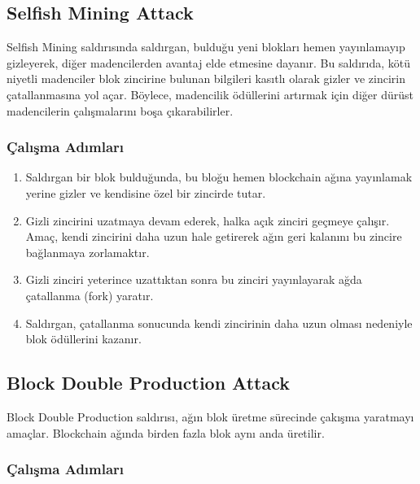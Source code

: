 \newpage

\subsection{Selfish Mining Attack}

Selfish Mining saldırısında saldırgan, bulduğu yeni blokları hemen yayınlamayıp gizleyerek, diğer madencilerden avantaj elde etmesine dayanır. Bu saldırıda, kötü niyetli madenciler blok zincirine bulunan bilgileri kasıtlı olarak gizler ve zincirin çatallanmasına yol açar. Böylece, madencilik ödüllerini artırmak için diğer dürüst madencilerin çalışmalarını boşa çıkarabilirler.

\subsubsection{Çalışma Adımları}

\begin{enumerate}
    \item Saldırgan bir blok bulduğunda, bu bloğu hemen blockchain ağına yayınlamak yerine gizler ve kendisine özel bir zincirde tutar.
    \item Gizli zincirini uzatmaya devam ederek, halka açık zinciri geçmeye çalışır. Amaç, kendi zincirini daha uzun hale getirerek ağın geri kalanını bu zincire bağlanmaya zorlamaktır.
    \item Gizli zinciri yeterince uzattıktan sonra bu zinciri yayınlayarak ağda çatallanma (fork) yaratır.
    \item Saldırgan, çatallanma sonucunda kendi zincirinin daha uzun olması nedeniyle blok ödüllerini kazanır.
\end{enumerate}

\newpage

\subsection{Block Double Production Attack}

Block Double Production saldırısı, ağın blok üretme sürecinde çakışma yaratmayı amaçlar. Blockchain ağında birden fazla blok aynı anda üretilir.

\subsubsection{Çalışma Adımları}

